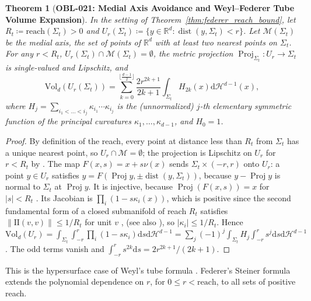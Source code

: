 \documentclass[11pt,a4paper,reqno]{amsart}
\newtheorem{theorem}{Theorem}[section]
\theoremstyle{definition}
\theoremstyle{remark}
\numberwithin{equation}{section}
\newcommand{\dif}{\mathrm{d}}
\DeclareMathOperator{\Proj}{Proj}
\begin{document}
\begin{theorem}[\textbf{OBL-021: Medial Axis Avoidance and Weyl--Federer Tube Volume Expansion}]
\label{thm:tube_volume_reach}
In the setting of Theorem~\ref{thm:federer_reach_bound}, let $R_t \coloneqq \mathrm{reach}(\Sigma_t) > 0$ and $U_r(\Sigma_t) \coloneqq \{y \in \mathbb{R}^d : \operatorname{dist}(y, \Sigma_t) < r\}$. Let $\mathcal{M}(\Sigma_t)$ be the medial axis, the set of points of $\mathbb{R}^d$ with at least two nearest points on $\Sigma_t$. For any $r < R_t$, $U_r(\Sigma_t) \cap \mathcal{M}(\Sigma_t) = \emptyset$, the metric projection $\Proj_{\Sigma_t} \colon U_r \to \Sigma_t$ is single-valued and Lipschitz, and
\begin{equation}
\mathrm{Vol}_d(U_r(\Sigma_t)) = \sum_{k=0}^{\lfloor \frac{d-1}{2} \rfloor} \frac{2 r^{2k+1}}{2k+1} \int_{\Sigma_t} H_{2k}(x) \dif\mathcal{H}^{d-1}(x),
\end{equation}
where $H_{j} = \sum_{i_1 < \dots < i_j} \kappa_{i_1}\cdots\kappa_{i_j}$ is the (unnormalized) $j$-th elementary symmetric function of the principal curvatures $\kappa_1, \dots, \kappa_{d-1}$, and $H_0 = 1$.
\end{theorem}

\begin{proof}
By definition of the reach, every point at distance less than $R_t$ from $\Sigma_t$ has a unique nearest point, so $U_r \cap \mathcal{M} = \emptyset$; the projection is Lipschitz on $U_r$ for $r < R_t$ by \cite[Thm.~4.8]{Federer1959}. The map $F(x, s) = x + s\nu(x)$ sends $\Sigma_t \times (-r, r)$ onto $U_r$: a point $y \in U_r$ satisfies $y = F(\Proj y, \pm\operatorname{dist}(y,\Sigma_t))$, because $y - \Proj y$ is normal to $\Sigma_t$ at $\Proj y$. It is injective, because $\Proj(F(x,s)) = x$ for $|s| < R_t$ \cite[Thm.~4.8]{Federer1959}. Its Jacobian is $\prod_{i}(1 - s\kappa_i(x))$, which is positive since the second fundamental form of a closed submanifold of reach $R_t$ satisfies $\|\mathrm{II}(v,v)\| \le 1/R_t$ for unit $v$ \cite[Prop.~A.1]{Aamari2019}, (see also \cite[Prop.~6.1]{NiyogiSmaleWeinberger2008}), so $|\kappa_i| \le 1/R_t$. Hence
$\mathrm{Vol}_d(U_r) = \int_{\Sigma_t}\int_{-r}^{r}\prod_i(1 - s\kappa_i)\dif s\dif\mathcal{H}^{d-1} = \sum_j (-1)^j \int_{\Sigma_t} H_j \int_{-r}^{r}s^j\dif s\dif\mathcal{H}^{d-1}$. The odd terms vanish and $\int_{-r}^r s^{2k}\dif s = 2r^{2k+1}/(2k+1)$.
\end{proof}

\noindent This is the hypersurface case of Weyl's tube formula \cite{Weyl1939}. Federer's Steiner formula \cite[Thm.~5.6]{Federer1959} extends the polynomial dependence on $r$, for $0 \le r < \mathrm{reach}$, to all sets of positive reach.
\end{document}
